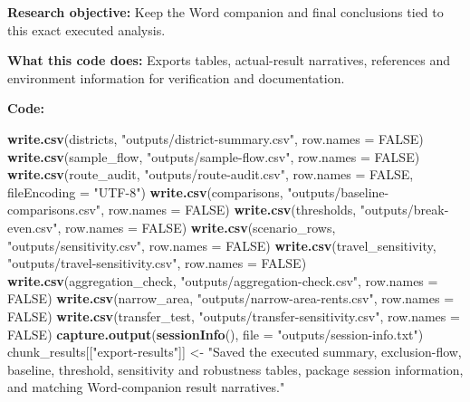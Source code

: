 \documentclass[
]{article}
\newenvironment{Shaded}{\begin{snugshade}}{\end{snugshade}}
\newcommand{\AttributeTok}[1]{\textcolor[rgb]{0.13,0.29,0.53}{#1}}
\newcommand{\ConstantTok}[1]{\textcolor[rgb]{0.56,0.35,0.01}{#1}}
\newcommand{\FunctionTok}[1]{\textcolor[rgb]{0.13,0.29,0.53}{\textbf{#1}}}
\newcommand{\NormalTok}[1]{#1}
\newcommand{\OtherTok}[1]{\textcolor[rgb]{0.56,0.35,0.01}{#1}}
\newcommand{\StringTok}[1]{\textcolor[rgb]{0.31,0.60,0.02}{#1}}
\begin{document}
\textbf{Research objective:} Keep the Word companion and final
conclusions tied to this exact executed analysis.

\textbf{What this code does:} Exports tables, actual-result narratives,
references and environment information for verification and
documentation.

\textbf{Code:}

\begin{Shaded}
\begin{Highlighting}[]
\FunctionTok{write.csv}\NormalTok{(districts, }\StringTok{"outputs/district{-}summary.csv"}\NormalTok{, }\AttributeTok{row.names =} \ConstantTok{FALSE}\NormalTok{)}
\FunctionTok{write.csv}\NormalTok{(sample\_flow, }\StringTok{"outputs/sample{-}flow.csv"}\NormalTok{, }\AttributeTok{row.names =} \ConstantTok{FALSE}\NormalTok{)}
\FunctionTok{write.csv}\NormalTok{(route\_audit, }\StringTok{"outputs/route{-}audit.csv"}\NormalTok{, }\AttributeTok{row.names =} \ConstantTok{FALSE}\NormalTok{, }\AttributeTok{fileEncoding =} \StringTok{"UTF{-}8"}\NormalTok{)}
\FunctionTok{write.csv}\NormalTok{(comparisons, }\StringTok{"outputs/baseline{-}comparisons.csv"}\NormalTok{, }\AttributeTok{row.names =} \ConstantTok{FALSE}\NormalTok{)}
\FunctionTok{write.csv}\NormalTok{(thresholds, }\StringTok{"outputs/break{-}even.csv"}\NormalTok{, }\AttributeTok{row.names =} \ConstantTok{FALSE}\NormalTok{)}
\FunctionTok{write.csv}\NormalTok{(scenario\_rows, }\StringTok{"outputs/sensitivity.csv"}\NormalTok{, }\AttributeTok{row.names =} \ConstantTok{FALSE}\NormalTok{)}
\FunctionTok{write.csv}\NormalTok{(travel\_sensitivity, }\StringTok{"outputs/travel{-}sensitivity.csv"}\NormalTok{, }\AttributeTok{row.names =} \ConstantTok{FALSE}\NormalTok{)}
\FunctionTok{write.csv}\NormalTok{(aggregation\_check, }\StringTok{"outputs/aggregation{-}check.csv"}\NormalTok{, }\AttributeTok{row.names =} \ConstantTok{FALSE}\NormalTok{)}
\FunctionTok{write.csv}\NormalTok{(narrow\_area, }\StringTok{"outputs/narrow{-}area{-}rents.csv"}\NormalTok{, }\AttributeTok{row.names =} \ConstantTok{FALSE}\NormalTok{)}
\FunctionTok{write.csv}\NormalTok{(transfer\_test, }\StringTok{"outputs/transfer{-}sensitivity.csv"}\NormalTok{, }\AttributeTok{row.names =} \ConstantTok{FALSE}\NormalTok{)}
\FunctionTok{capture.output}\NormalTok{(}\FunctionTok{sessionInfo}\NormalTok{(), }\AttributeTok{file =} \StringTok{"outputs/session{-}info.txt"}\NormalTok{)}
\NormalTok{chunk\_results[[}\StringTok{"export{-}results"}\NormalTok{]] }\OtherTok{\textless{}{-}} \StringTok{"Saved the executed summary, exclusion{-}flow, baseline, threshold, sensitivity and robustness tables, package session information, and matching Word{-}companion result narratives."}


\end{Highlighting}
\end{Shaded}
\end{document}
